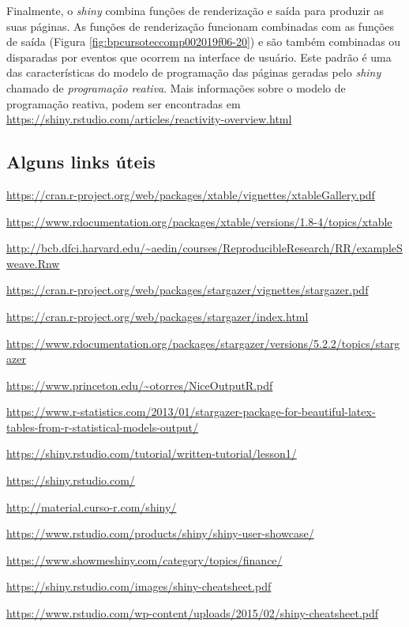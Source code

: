 \documentclass[12pt,a4paper,oneside]{erdc}
\begin{document}
Finalmente, o \textit{shiny} combina funções de renderização e saída para produzir as suas páginas. As funções de renderização funcionam combinadas com as funções de saída (Figura \ref{fig:bpcursoteccomp002019f06-20}) e são também combinadas ou disparadas por eventos que ocorrem na interface de usuário. Este padrão é uma das características do modelo de programação das páginas geradas pelo \textit{shiny} chamado de \textit{programação reativa}. Mais informações sobre o modelo de programação reativa, podem ser encontradas em \url{https://shiny.rstudio.com/articles/reactivity-overview.html}


\subsection{Alguns links úteis}



\url{https://cran.r-project.org/web/packages/xtable/vignettes/xtableGallery.pdf}

\url{https://www.rdocumentation.org/packages/xtable/versions/1.8-4/topics/xtable}

\url{http://bcb.dfci.harvard.edu/~aedin/courses/ReproducibleResearch/RR/exampleSweave.Rnw}

\url{https://cran.r-project.org/web/packages/stargazer/vignettes/stargazer.pdf}

\url{https://cran.r-project.org/web/packages/stargazer/index.html}

\url{https://www.rdocumentation.org/packages/stargazer/versions/5.2.2/topics/stargazer}

\url{https://www.princeton.edu/~otorres/NiceOutputR.pdf}

\url{https://www.r-statistics.com/2013/01/stargazer-package-for-beautiful-latex-tables-from-r-statistical-models-output/}

\url{https://shiny.rstudio.com/tutorial/written-tutorial/lesson1/}

\url{https://shiny.rstudio.com/}

\url{http://material.curso-r.com/shiny/}

\url{https://www.rstudio.com/products/shiny/shiny-user-showcase/}

\url{https://www.showmeshiny.com/category/topics/finance/}

\url{https://shiny.rstudio.com/images/shiny-cheatsheet.pdf}

\url{https://www.rstudio.com/wp-content/uploads/2015/02/shiny-cheatsheet.pdf}
\end{document}
